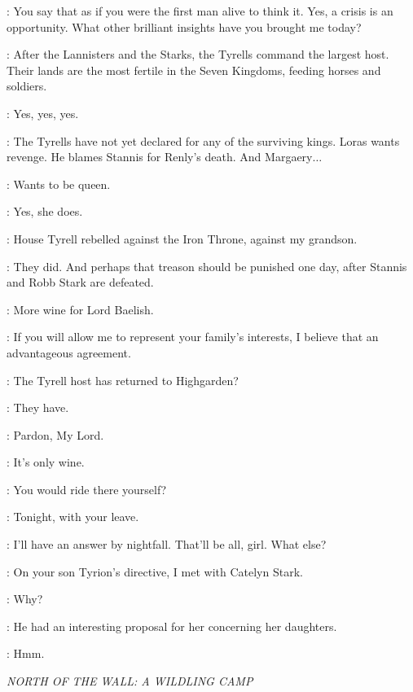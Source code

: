 \TYWIN: You say that as if you were the first man alive to think it. Yes, a crisis is an opportunity. What other brilliant insights have you brought me today? 

\LITTLEFINGER: After the Lannisters and the Starks, the Tyrells command the largest host. Their lands are the most fertile in the Seven Kingdoms, feeding horses and soldiers. 

\TYWIN: Yes, yes, yes. 

\LITTLEFINGER: The Tyrells have not yet declared for any of the surviving kings. Loras wants revenge. He blames Stannis for Renly's death. And Margaery$\ldots$ 

\TYWIN: Wants to be queen. 

\LITTLEFINGER: Yes, she does. 

\TYWIN: House Tyrell rebelled against the Iron Throne, against my grandson. 

\LITTLEFINGER: They did. And perhaps that treason should be punished one day, after Stannis and Robb Stark are defeated. 

\TYWIN:  More wine for Lord Baelish. 


\LITTLEFINGER: If you will allow me to represent your family's interests, I believe that an advantageous agreement. 

\TYWIN: The Tyrell host has returned to Highgarden? 

\LITTLEFINGER: They have.


\ARYA: Pardon, My Lord. 

\LITTLEFINGER: It's only wine. 

\TYWIN: You would ride there yourself? 

\LITTLEFINGER: Tonight, with your leave. 

\TYWIN: I'll have an answer by nightfall. That'll be all, girl. What else? 

\LITTLEFINGER: On your son Tyrion's directive, I met with Catelyn Stark. 

\TYWIN: Why? 

\LITTLEFINGER: He had an interesting proposal for her concerning her daughters. 

\TYWIN: Hmm. 


\scene

\textit{NORTH OF THE WALL: A WILDLING CAMP} 


